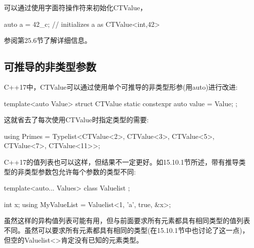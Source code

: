 可以通过使用字面符操作符来初始化CTValue，

\begin{cpp}
auto a = 42_c; // initializes a as CTValue<int,42>
\end{cpp}

参阅第25.6节了解详细信息。

\subsection{可推导的非类型参数}

C++17中，CTValue可以通过使用单个可推导的非类型形参(用auto)进行改进:

\begin{cpp}
template<auto Value>
struct CTValue
{
	static constexpr auto value = Value;
};
\end{cpp}

这就省去了每次使用CTValue时指定类型的需要:

\begin{cpp}
using Primes = Typelist<CTValue<2>, CTValue<3>, CTValue<5>,
						CTValue<7>, CTValue<11>>;
\end{cpp}

C++17的值列表也可以这样，但结果不一定更好。如15.10.1节所述，带有推导类型的非类型参数包允许每个参数的类型不同:

\begin{cpp}
template<auto... Values>
class Valuelist { };

int x;
using MyValueList = Valuelist<1, 'a', true, &x>;
\end{cpp}

虽然这样的异构值列表可能有用，但与前面要求所有元素都具有相同类型的值列表不同。虽然可以要求所有元素都具有相同的类型(在15.10.1节中也讨论了这一点)，但空的Valuelist<>肯定没有已知的元素类型。













